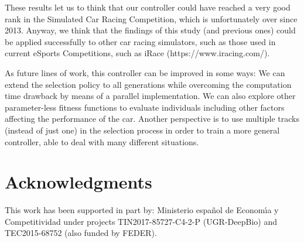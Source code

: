 \documentclass[10pt,journal,compsoc]{IEEEtran}
\begin{document}
These results let us to think that our controller could have reached a very good rank in the Simulated Car Racing Competition, which is unfortunately over since 2013. Anyway, we think that the findings of this study (and previous ones) could be applied successfully to other car racing simulators, such as those used in current eSports Competitions, such as iRace (https://www.iracing.com/).

As future lines of work, this controller can be improved in some ways:
We can extend the selection policy to all generations while overcoming the computation time drawback by means of a parallel implementation.
We can also explore other parameter-less fitness functions to evaluate individuals including other factors affecting the performance of the car.
Another perspective is to use multiple tracks (instead of just one) in the selection process in order to train a more general controller, able to deal with many different situations.

\section*{Acknowledgments}

This work has been supported in part by: Ministerio espa\~{n}ol de
Econom\'{\i}a y Competitividad under projects  TIN2017-85727-C4-2-P (UGR-DeepBio) and TEC2015-68752 (also funded by FEDER).





\end{document}
